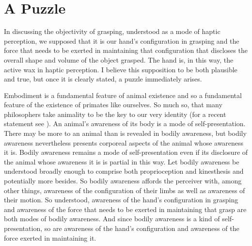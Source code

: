 
\section{A Puzzle} %
\label{sec:a_puzzle}


In discussing the objectivity of grasping, understood as a mode of haptic perception, we supposed that it is our hand's configuration in grasping and the force that needs to be exerted in maintaining that configuration that discloses the overall shape and volume of the object grasped. The hand is, in this way, the active wax in haptic perception. I believe this supposition to be both plausible and true, but once it is clearly stated, a puzzle immediately arises. 

Embodiment is a fundamental feature of animal existence and so a fundamental feature of the existence of primates like ourselves. So much so, that many philosophers take animality to be the key to our very identity (for a recent statement see \citealt{Snowdon:2014ta}). An animal's awareness of its body is a mode of self-presentation. There may be more to an animal than is revealed in bodily awareness, but bodily awareness nevertheless presents corporeal aspects of the animal whose awareness it is. Bodily awareness remains a mode of self-presentation even if its disclosure of the animal whose awareness it is is partial in this way. Let bodily awareness be understood broadly enough to comprise both proprioception and kinesthesis and potentially more besides. So bodily awareness affords the perceiver with, among other things, awareness of the configuration of their limbs as well as awareness of their motion. So understood, awareness of the hand's configuration in grasping and awareness of the force that needs to be exerted in maintaining that grasp are both modes of bodily awareness. And since bodily awareness is a kind of self-presentation, so are awareness of the hand's configuration and awareness of the force exerted in maintaining it. 


